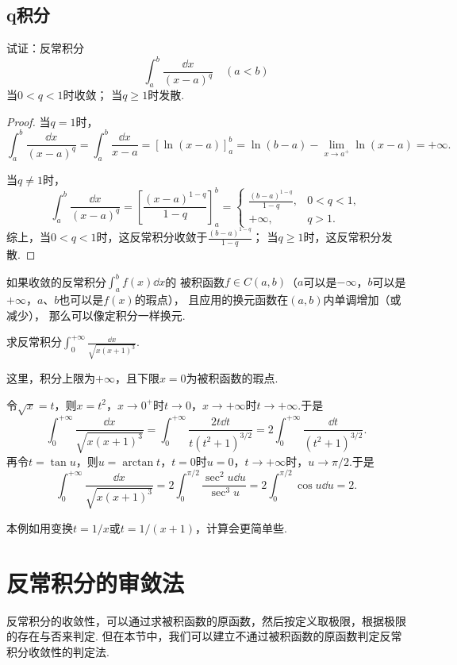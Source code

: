 \subsection{q积分}
\begin{example}[q积分]\label{example:定积分.q积分}
试证：反常积分\[
\int_a^b \frac{\dd{x}}{(x-a)^q} \quad(a<b)
\]
当\(0 < q < 1\)时收敛；
当\(q \geqslant 1\)时发散.
\begin{proof}
当\(q=1\)时，\[
\int_a^b \frac{\dd{x}}{(x-a)^q}
= \int_a^b \frac{\dd{x}}{x-a}
= [\ln(x-a)]_a^b
= \ln(b-a) - \lim\limits_{x \to a^+} \ln(x-a) = +\infty.
\]

\def\arraystretch{1.5}
当\(q\neq1\)时，\[
\int_a^b \frac{\dd{x}}{(x-a)^q}
= \left[ \frac{(x-a)^{1-q}}{1-q} \right]_a^b
= \left\{ \begin{array}{cc}
\frac{(b-a)^{1-q}}{1-q}, & 0<q<1, \\
+\infty, & q>1.
\end{array} \right.
\]
综上，当\(0<q<1\)时，这反常积分收敛于\(\frac{(b-a)^{1-q}}{1-q}\)；
当\(q\geqslant1\)时，这反常积分发散.
\end{proof}
\end{example}

如果收敛的反常积分\(\int_a^b f(x) \dd{x}\)的%
被积函数\(f \in C(a,b)\)（\(a\)可以是\(-\infty\)，\(b\)可以是\(+\infty\)，\(a\)、\(b\)也可以是\(f(x)\)的瑕点），%
且应用的换元函数在\((a,b)\)内单调增加（或减少），%
那么可以像定积分一样换元.

\begin{example}
求反常积分\(\int_0^{+\infty} \frac{\dd{x}}{\sqrt{x(x+1)^3}}\).
\begin{solution}
这里，积分上限为\(+\infty\)，且下限\(x=0\)为被积函数的瑕点.

令\(\sqrt{x} = t\)，则\(x = t^2\)，\(x\to0^+\)时\(t\to0\)，\(x\to+\infty\)时\(t\to+\infty\).于是\[
\int_0^{+\infty} \frac{\dd{x}}{\sqrt{x(x+1)^3}}
= \int_0^{+\infty} \frac{2t\dd{t}}{t(t^2+1)^{3/2}}
= 2 \int_0^{+\infty} \frac{\dd{t}}{(t^2+1)^{3/2}}.
\]
再令\(t = \tan u\)，则\(u = \arctan t\)，\(t=0\)时\(u=0\)，\(t\to+\infty\)时，\(u\to\pi/2\).于是\[
\int_0^{+\infty} \frac{\dd{x}}{\sqrt{x(x+1)^3}}
= 2 \int_0^{\pi/2} \frac{\sec^2 u \dd{u}}{\sec^3 u}
= 2 \int_0^{\pi/2} \cos u \dd{u}
= 2.
\]
\end{solution}
本例如用变换\(t = 1/x\)或\(t = 1/(x+1)\)，计算会更简单些.
\end{example}

\section{反常积分的审敛法}
反常积分的收敛性，可以通过求被积函数的原函数，然后按定义取极限，根据极限的存在与否来判定.
但在本节中，我们可以建立不通过被积函数的原函数判定反常积分收敛性的判定法.

